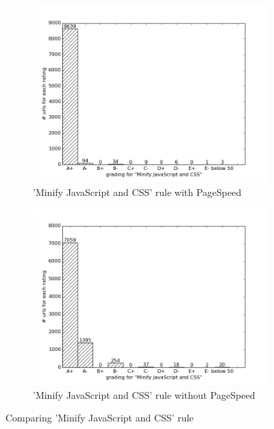 \documentclass[conference]{IEEEtran}
\begin{document}
\begin{figure}
    \centering
    \begin{subfigure}[b]{\columnwidth}        %
        \centering
        \includegraphics[scale=0.33]{new-img-jpg/container-jpg/Minify JavaScript and CSS.jpg}
        \caption{'Minify JavaScript and CSS' rule with PageSpeed}
        \label{fig:minify-pagespeed}
    \end{subfigure}
    \hfill
    \begin{subfigure}[b]{\columnwidth}        %
        \centering
        \includegraphics[scale=0.33]{new-img-jpg/deploy-jpg/Minify JavaScript and CSS.jpg}
        \caption{'Minify JavaScript and CSS' rule without PageSpeed }
        \label{fig:minify-nopagespeed}
    \end{subfigure}
    \caption{Comparing 'Minify JavaScript and CSS' rule}
    \label{fig:minify-comparison}
\end{figure}
\end{document}
